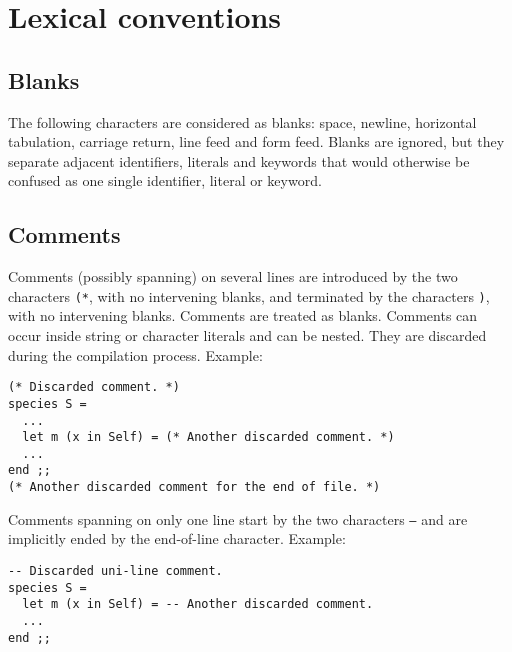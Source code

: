
\section{Lexical conventions}



\subsection{Blanks}
The following characters are considered as blanks: space, newline,
horizontal tabulation, carriage return, line feed and form
feed. Blanks are ignored, but they separate adjacent identifiers,
literals and keywords that would otherwise be confused as one single
identifier, literal or keyword.



\subsection{Comments}
Comments (possibly spanning) on several lines are introduced by the
two characters {\tt (*}, with no intervening blanks, and terminated by
the characters {\tt *)}, with no intervening blanks. Comments are
treated as blanks. Comments can occur inside string or character
literals and can be nested. They are discarded during the compilation
process. Example:
{\scriptsize
\begin{lstlisting}
(* Discarded comment. *)
species S =
  ...
  let m (x in Self) = (* Another discarded comment. *)
  ...
end ;;
(* Another discarded comment for the end of file. *)
\end{lstlisting}
}


Comments spanning on only one line start by the two characters
{\tt --} and are implicitly ended by the end-of-line character.
Example:
{\scriptsize
\begin{lstlisting}
-- Discarded uni-line comment.
species S =
  let m (x in Self) = -- Another discarded comment.
  ...
end ;;
\end{lstlisting}
}



